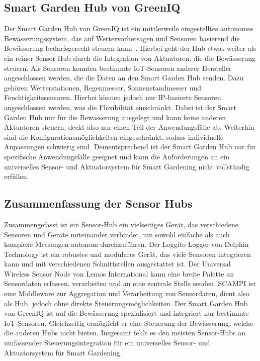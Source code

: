 \subsection{Smart Garden Hub von GreenIQ}
Der Smart Garden Hub von GreenIQ ist ein mittlerweile eingestelltes autonomes Bewässerungssystem, das auf Wettervorhersagen und Sensoren basierend die Bewässerung bedarfsgerecht steuern kann~\cite{GreenIQ}.
Hierbei geht der Hub etwas weiter als ein reiner Sensor-Hub durch die Integration von Aktuatoren, die die Bewässerung steuern.
Als Sensoren konnten bestimmte IoT-Sensoren anderer Hersteller angeschlossen werden, die die Daten an den Smart Garden Hub senden.
Dazu gehören Wetterstationen, Regenmesser, Sonnenstandmesser und Feuchtigkeitssensoren.
Hierbei können jedoch nur IP-basierte Sensoren angeschlossen werden, was die Flexibilität einschränkt.
Dabei ist der Smart Garden Hub nur für die Bewässerung ausgelegt und kann keine anderen Aktuatoren steuern, deckt also nur einen Teil der Anwendungsfälle ab.
Weiterhin sind die Konfigurationsmöglichkeiten eingeschränkt, sodass individuelle Anpassungen schwierig sind.
Dementsprechend ist der Smart Garden Hub nur für spezifische Anwendungsfälle geeignet und kann die Anforderungen an ein universelles Sensor- und Aktuatorsystem für Smart Gardening nicht vollständig erfüllen.

\subsection{Zusammenfassung der Sensor Hubs}
Zusammengefasst ist ein Sensor-Hub ein vielseitiges Gerät, das verschiedene Sensoren und Geräte miteinander verbindet, um sowohl einfache als auch komplexe Messungen autonom durchzuführen.
Der Loggito Logger von Delphin Technology ist ein robustes und modulares Gerät, das viele Sensoren integrieren kann und mit verschiedenen Schnittstellen ausgestattet ist.
Der Universal Wireless Sensor Node von Lemos International kann eine breite Palette an Sensordaten erfassen, verarbeiten und an eine zentrale Stelle senden.
SCAMPI ist eine Middleware zur Aggregation und Verarbeitung von Sensordaten, dient also als Hub, jedoch ohne direkte Steuerungsmöglichkeiten.
Der Smart Garden Hub von GreenIQ ist auf die Bewässerung spezialisiert und integriert nur bestimmte IoT-Sensoren.
Gleichzeitig ermöglicht er eine Steuerung der Bewässerung, welche die anderen Hubs nicht bieten.
Insgesamt fehlt es den meisten Sensor-Hubs an umfassender Steuerungsintegration für ein universelles Sensor- und Aktuatorsystem für Smart Gardening.



